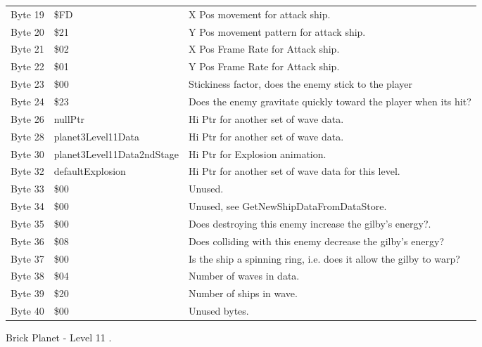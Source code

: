 \begin{figure}[H]
{\begin{adjustbox}{width=12cm}
\begin{tabular}{lll}
 Byte 19 & \$FD                        & X Pos movement for attack ship.                                    \\
 Byte 20 & \$21                        & Y Pos movement pattern for attack ship.                            \\
 Byte 21 & \$02                        & X Pos Frame Rate for Attack ship.                                  \\
 Byte 22 & \$01                        & Y Pos Frame Rate for Attack ship.                                  \\
 Byte 23 & \$00                        & Stickiness factor, does the enemy stick to the player              \\
 Byte 24 & \$23                        & Does the enemy gravitate quickly toward the player when its hit?   \\
 Byte 26 & nullPtr                    & Hi Ptr for another set of wave data.                               \\
 Byte 28 & planet3Level11Data         & Hi Ptr for another set of wave data.                               \\
 Byte 30 & planet3Level11Data2ndStage & Hi Ptr for Explosion animation.                                    \\
 Byte 32 & defaultExplosion           & Hi Ptr for another set of wave data for this level.                \\
 Byte 33 & \$00                        & Unused.                                                            \\
 Byte 34 & \$00                        & Unused, see GetNewShipDataFromDataStore.                           \\
 Byte 35 & \$00                        & Does destroying this enemy increase the gilby's energy?.           \\
 Byte 36 & \$08                        & Does colliding with this enemy decrease the gilby's energy?        \\
 Byte 37 & \$00                        & Is the ship a spinning ring, i.e. does it allow the gilby to warp? \\
 Byte 38 & \$04                        & Number of waves in data.                                           \\
 Byte 39 & \$20                        & Number of ships in wave.                                           \\
 Byte 40 & \$00                        & Unused bytes.                                                      \\
\bottomrule
\end{tabular}

  \end{adjustbox}

  }\caption*{Brick Planet - Level 11
.}
\end{figure}

